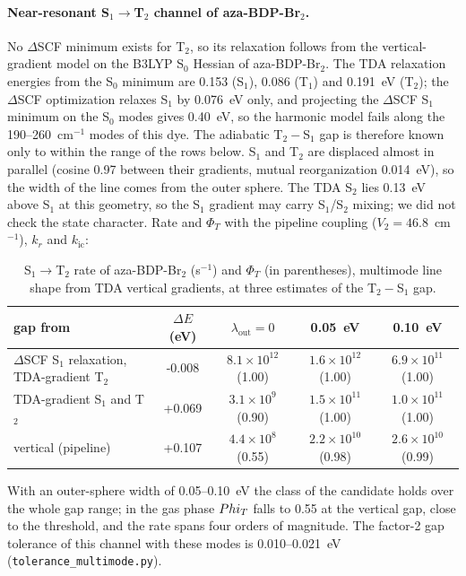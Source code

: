 \paragraph{Near-resonant S$_1\to$T$_2$ channel of aza-BDP-Br$_2$.} No $\Delta$SCF minimum exists for T$_2$, so its relaxation follows from the vertical-gradient model on the B3LYP S$_0$ Hessian of aza-BDP-Br$_2$. The TDA relaxation energies from the S$_0$ minimum are 0.153 (S$_1$), 0.086 (T$_1$) and 0.191~eV (T$_2$); the $\Delta$SCF optimization relaxes S$_1$ by 0.076~eV only, and projecting the $\Delta$SCF S$_1$ minimum on the S$_0$ modes gives 0.40~eV, so the harmonic model fails along the 190--260~cm$^{-1}$ modes of this dye. The adiabatic T$_2-$S$_1$ gap is therefore known only to within the range of the rows below. S$_1$ and T$_2$ are displaced almost in parallel (cosine 0.97 between their gradients, mutual reorganization 0.014~eV), so the width of the line comes from the outer sphere. The TDA S$_2$ lies 0.13~eV above S$_1$ at this geometry, so the S$_1$ gradient may carry S$_1$/S$_2$ mixing; we did not check the state character. Rate and $\Phi_T$ with the pipeline coupling ($V_2=46.8$~cm$^{-1}$), $k_r$ and $k_\mathrm{ic}$:

\begin{table}[h]\centering\small
\caption{S$_1\to$T$_2$ rate of aza-BDP-Br$_2$ (s$^{-1}$) and $\Phi_T$ (in parentheses), multimode line shape from TDA vertical gradients, at three estimates of the T$_2-$S$_1$ gap.}
\begin{tabular}{p{3.3cm}cccc}\hline
gap from & $\Delta E$ (eV) & $\lambda_\mathrm{out}=0$ & 0.05~eV & 0.10~eV \\ \hline
$\Delta$SCF S$_1$ relaxation, TDA-gradient T$_2$ & -0.008 & $8.1\times10^{12}$ (1.00) & $1.6\times10^{12}$ (1.00) & $6.9\times10^{11}$ (1.00) \\
TDA-gradient S$_1$ and T$_2$ & +0.069 & $3.1\times10^{9}$ (0.90) & $1.5\times10^{11}$ (1.00) & $1.0\times10^{11}$ (1.00) \\
vertical (pipeline) & +0.107 & $4.4\times10^{8}$ (0.55) & $2.2\times10^{10}$ (0.98) & $2.6\times10^{10}$ (0.99) \\
\hline\end{tabular}\end{table}

With an outer-sphere width of 0.05--0.10~eV the class of the candidate holds over the whole gap range; in the gas phase $\\Phi_T$ falls to 0.55 at the vertical gap, close to the threshold, and the rate spans four orders of magnitude. The factor-2 gap tolerance of this channel with these modes is 0.010--0.021~eV (\texttt{tolerance\_multimode.py}).
